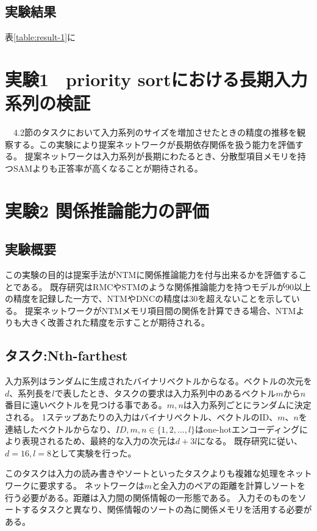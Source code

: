 \subsection{実験結果}
表\ref{table:result-1}に

\section{実験1　priority sortにおける長期入力系列の検証}
　4.2節のタスクにおいて入力系列のサイズを増加させたときの精度の推移を観察する。この実験により提案ネットワークが長期依存関係を扱う能力を評価する。
提案ネットワークは入力系列が長期にわたるとき、分散型項目メモリを持つSAMよりも正答率が高くなることが期待される。

\section{実験2 関係推論能力の評価}
\subsection{実験概要}
この実験の目的は提案手法がNTMに関係推論能力を付与出来るかを評価することである。
既存研究\cite{rrnn}\cite{sam}はRMCやSTMのような関係推論能力を持つモデルが90以上の精度を記録した一方で、NTMやDNCの精度は30を超えないことを示している。
提案ネットワークがNTMメモリ項目間の関係を計算できる場合、NTMよりも大きく改善された精度を示すことが期待される。

\subsection{タスク:Nth-farthest}
入力系列はランダムに生成されたバイナリベクトルからなる。ベクトルの次元を$d$、系列長を$l$で表したとき、タスクの要求は入力系列中のあるベクトル$m$から$n$番目に遠いベクトルを見つける事である。$m,n$は入力系列ごとにランダムに決定される。
1ステップあたりの入力はバイナリベクトル、ベクトルのID、$m$、$n$を連結したベクトルからなり、$ID,m,n∈\{1,2,…,l\}$はone-hotエンコーディングにより表現されるため、最終的な入力の次元は$d+3l$になる。
既存研究\cite{rrnn}に従い、$d=16,l=8$として実験を行った。

このタスクは入力の読み書きやソートといったタスクよりも複雑な処理をネットワークに要求する。
ネットワークは$m$と全入力のペアの距離を計算しソートを行う必要がある。距離は入力間の関係情報の一形態である。
入力そのものをソートするタスクと異なり、関係情報のソートの為に関係メモリを活用する必要がある。

